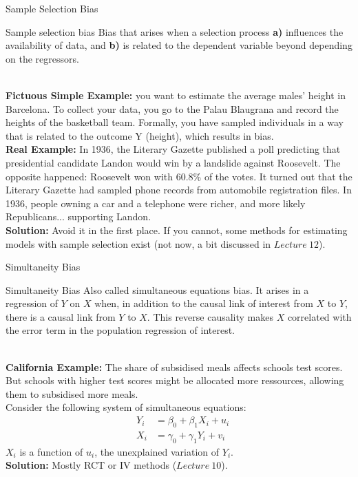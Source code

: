 \documentclass[notes,10pt, aspectratio=169]{beamer}
\begin{document}
\begin{frame}{Sample Selection Bias}

\begin{block}{Sample selection bias}
Bias that arises when a selection process \textbf{a)} influences the availability of data, and  \textbf{b)} is related to the dependent variable beyond depending on the regressors.
\end{block}
\\[1em]
\textbf{Fictuous Simple Example:} you want to estimate the average males' height in Barcelona. To  collect your data, you go to the Palau Blaugrana and record the heights of the  basketball team. Formally, you have sampled individuals in a way that is related to the outcome Y (height), which results in bias.\\[1em]

\textbf{Real Example:} In 1936, the Literary Gazette published a poll predicting that presidential candidate Landon would win by a landslide against Roosevelt. The opposite happened: Roosevelt won with 60.8\% of the votes. It turned out that the Literary Gazette had sampled phone records from automobile registration files. In 1936, people owning a car and a telephone were richer, and more likely Republicans... supporting Landon.\\[1em]

\textbf{Solution:} Avoid it in the first place. If you cannot, some methods for estimating models with sample selection exist (not now,  a bit discussed in $Lecture~12$).
\end{frame}

\begin{frame}{Simultaneity Bias}
\begin{block}{Simultaneity Bias}
Also called simultaneous equations bias. It arises in a regression of $Y$ on $X$ when, in addition to the causal link of interest from $X$ to $Y$, there is a causal link from $Y$ to $X$. This reverse causality makes $X$ correlated with the error term in the population regression of interest.
\end{block}
\\[1em]
\textbf{California Example:} The share of subsidised meals affects schools test scores. But schools with higher test scores might be allocated more ressources, allowing them to subsidised more meals. \\[1em]

Consider the following system of simultaneous equations:
\begin{eqnarray*}
    &Y_i &= \beta_0 + \beta_1 X_i + u_i\\
    &X_i &= \gamma_0 + \gamma_1 Y_i + v_i
\end{eqnarray*}
$X_i$ is a function of $u_i$, the unexplained variation of $Y_i$.\\[1em]

\textbf{Solution:} Mostly RCT or IV methods ($Lecture~10$).
\end{frame}
\end{document}
